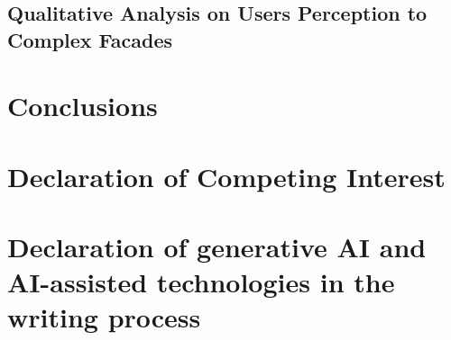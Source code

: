 \begin{linenumbers}
\subsection{Qualitative Analysis on Users Perception to Complex Facades}
\label{subsec:ResultsSurvey}



\section{Conclusions}
\label{sec:Conclusion}



\section{Declaration of Competing Interest}
\label{sec:DeclarationInterest}


\section{Declaration of generative AI and AI-assisted technologies in the writing process}
\label{sec:Declaration AI}


\end{linenumbers}
